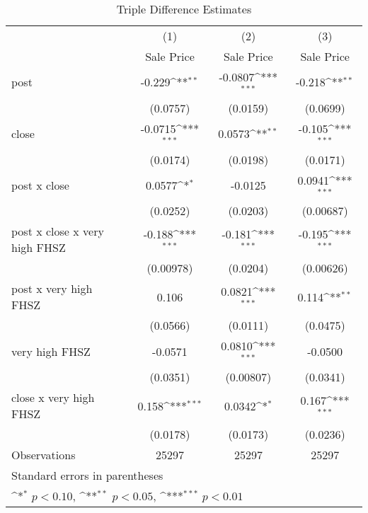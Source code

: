 \begin{table}[htbp]\centering
\def\sym#1{\ifmmode^{#1}\else\(^{#1}\)\fi}
\caption{Triple Difference Estimates\label{tabl}}
\begin{tabular}{l*{3}{c}}
\hline\hline
                    &\multicolumn{1}{c}{(1)}&\multicolumn{1}{c}{(2)}&\multicolumn{1}{c}{(3)}\\
                    &\multicolumn{1}{c}{Sale Price}&\multicolumn{1}{c}{Sale Price}&\multicolumn{1}{c}{Sale Price}\\
\hline
post                &      -0.229\sym{**} &     -0.0807\sym{***}&      -0.218\sym{**} \\
                    &    (0.0757)         &    (0.0159)         &    (0.0699)         \\
[1em]
close               &     -0.0715\sym{***}&      0.0573\sym{**} &      -0.105\sym{***}\\
                    &    (0.0174)         &    (0.0198)         &    (0.0171)         \\
[1em]
post x close        &      0.0577\sym{*}  &     -0.0125         &      0.0941\sym{***}\\
                    &    (0.0252)         &    (0.0203)         &   (0.00687)         \\
[1em]
post x close x very high FHSZ&      -0.188\sym{***}&      -0.181\sym{***}&      -0.195\sym{***}\\
                    &   (0.00978)         &    (0.0204)         &   (0.00626)         \\
[1em]
post x very high FHSZ&       0.106         &      0.0821\sym{***}&       0.114\sym{**} \\
                    &    (0.0566)         &    (0.0111)         &    (0.0475)         \\
[1em]
very high FHSZ      &     -0.0571         &      0.0810\sym{***}&     -0.0500         \\
                    &    (0.0351)         &   (0.00807)         &    (0.0341)         \\
[1em]
close x very high FHSZ&       0.158\sym{***}&      0.0342\sym{*}  &       0.167\sym{***}\\
                    &    (0.0178)         &    (0.0173)         &    (0.0236)         \\
\hline
Observations        &       25297         &       25297         &       25297         \\
\hline\hline
\multicolumn{4}{l}{\footnotesize Standard errors in parentheses}\\
\multicolumn{4}{l}{\footnotesize \sym{*} \(p<0.10\), \sym{**} \(p<0.05\), \sym{***} \(p<0.01\)}\\
\end{tabular}
\end{table}
